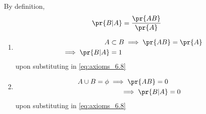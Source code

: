 By definition,
%
\begin{align}
\pr{B|A} = \frac{\pr{AB}}{\pr{A}} 
\label{eq:axioms_6.8}
\end{align}
%
\begin{enumerate}
\item
\begin{align}
A &\subset B \implies \pr{AB} = \pr{A}
\\
\implies \pr{B|A} &= 1
\end{align}
%
upon substituting in \eqref{eq:axioms_6.8}
\item
\begin{align}
A \cup B = \phi \implies \pr{AB} = 0
\\
\implies \pr{B|A} &= 0
\end{align}
%
upon substituting in \eqref{eq:axioms_6.8}
\end{enumerate}